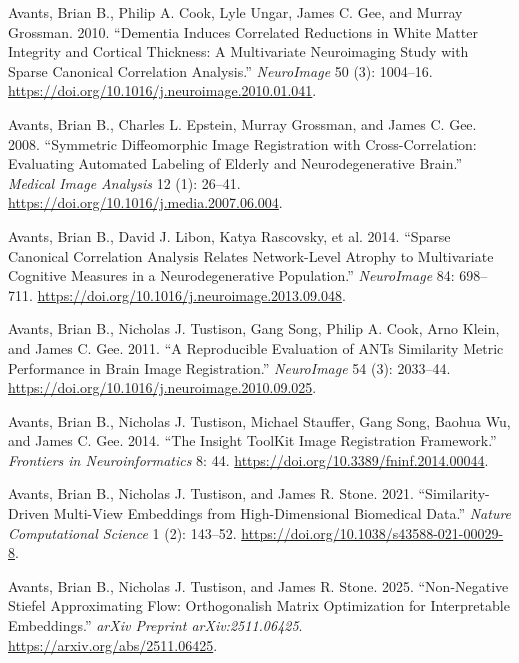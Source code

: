 \documentclass[
  10pt,
  letterpaper,
]{report}
\newlength{\cslhangindent}
\newenvironment{CSLReferences}[2] %
 {\begin{list}{}{%
  \setlength{\itemindent}{0pt}
  \setlength{\leftmargin}{0pt}
  \setlength{\parsep}{0pt}
  \ifodd #1
   \setlength{\leftmargin}{\cslhangindent}
   \setlength{\itemindent}{-1\cslhangindent}
  \fi
  \setlength{\itemsep}{#2\baselineskip}}}
 {\end{list}}
\begin{document}
\begin{CSLReferences}{1}{1}
Avants, Brian B., Philip A. Cook, Lyle Ungar, James C. Gee, and Murray
Grossman. 2010. {``Dementia Induces Correlated Reductions in White
Matter Integrity and Cortical Thickness: A Multivariate Neuroimaging
Study with Sparse Canonical Correlation Analysis.''} \emph{NeuroImage}
50 (3): 1004--16.
\url{https://doi.org/10.1016/j.neuroimage.2010.01.041}.

Avants, Brian B., Charles L. Epstein, Murray Grossman, and James C. Gee.
2008. {``Symmetric Diffeomorphic Image Registration with
Cross-Correlation: Evaluating Automated Labeling of Elderly and
Neurodegenerative Brain.''} \emph{Medical Image Analysis} 12 (1):
26--41. \url{https://doi.org/10.1016/j.media.2007.06.004}.

Avants, Brian B., David J. Libon, Katya Rascovsky, et al. 2014.
{``Sparse Canonical Correlation Analysis Relates Network-Level Atrophy
to Multivariate Cognitive Measures in a Neurodegenerative Population.''}
\emph{NeuroImage} 84: 698--711.
\url{https://doi.org/10.1016/j.neuroimage.2013.09.048}.

Avants, Brian B., Nicholas J. Tustison, Gang Song, Philip A. Cook, Arno
Klein, and James C. Gee. 2011. {``A Reproducible Evaluation of {ANTs}
Similarity Metric Performance in Brain Image Registration.''}
\emph{NeuroImage} 54 (3): 2033--44.
\url{https://doi.org/10.1016/j.neuroimage.2010.09.025}.

Avants, Brian B., Nicholas J. Tustison, Michael Stauffer, Gang Song,
Baohua Wu, and James C. Gee. 2014. {``The {Insight ToolKit} Image
Registration Framework.''} \emph{Frontiers in Neuroinformatics} 8: 44.
\url{https://doi.org/10.3389/fninf.2014.00044}.

Avants, Brian B., Nicholas J. Tustison, and James R. Stone. 2021.
{``Similarity-Driven Multi-View Embeddings from High-Dimensional
Biomedical Data.''} \emph{Nature Computational Science} 1 (2): 143--52.
\url{https://doi.org/10.1038/s43588-021-00029-8}.

Avants, Brian B., Nicholas J. Tustison, and James R. Stone. 2025.
{``Non-Negative {Stiefel} Approximating Flow: Orthogonalish Matrix
Optimization for Interpretable Embeddings.''} \emph{arXiv Preprint
arXiv:2511.06425}. \url{https://arxiv.org/abs/2511.06425}.


\end{CSLReferences}
\end{document}
